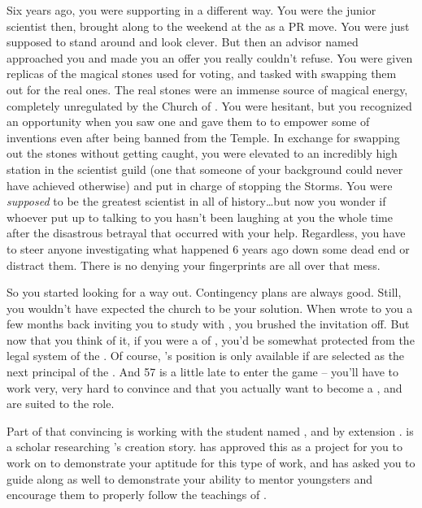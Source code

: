 \documentclass[char]{GL2020}
\begin{document}
Six years ago, you were supporting \cChupInventor{} in a different way. You were the junior scientist then, brought along to the weekend at the \pSchool{} as a PR move. You were just supposed to stand around and look clever. But then an advisor named \cEvil{} approached you and made you an offer you really couldn’t refuse. You were given replicas of the magical stones used for voting, and tasked with swapping them out for the real ones. The real stones were an immense source of magical energy, completely unregulated by the Church of \cTechGod{}. You were hesitant, but you recognized an opportunity when you saw one and gave them to \cChupInventor{} to empower some of \cChupInventor{\their} inventions even after being banned from the Temple. In exchange for swapping out the stones without getting caught, you were elevated to an incredibly high station in the scientist guild (one that someone of your background could never have achieved otherwise) and put in charge of stopping the Storms. You were \emph{supposed} to be the greatest scientist in all of history\ldots but now you wonder if whoever put \cEvil{} up to talking to you hasn’t been laughing at you the whole time after the disastrous betrayal that occurred with your help. Regardless, you have to steer anyone investigating what happened 6 years ago down some dead end or distract them. There is no denying your fingerprints are all over that mess.

So you started looking for a way out. Contingency plans are always good. Still, you wouldn’t have expected the church to be your solution. When \cBeetle{} wrote to you a few months back inviting you to study with \cBeetle{\them}, you brushed the invitation off. But now that you think of it, if you were a \cHeadScientist{\cleric} of \cTechGod{}, you’d be somewhat protected from the legal system of the \pTech{}. Of course, \cBeetle{}’s position is only available if \cBeetle{\they} are selected as the next principal of the \pSc{}. And 57 is a little late to enter the game -- you’ll have to work very, very hard to convince \cAntiChup{} and \cReligion{} that you actually want to become a \HeadScientist{\cleric}, and are suited to the role.

Part of that convincing is working with the student named \cScholarship{}, and by extension \cEbbPriest{}. \cEbbPriest{} is a scholar researching \pEarth{}’s creation story. \cReligion{} has approved this as a project for you to work on to demonstrate your aptitude for this type of work, and has asked you to guide \cScholarship{} along as well to demonstrate your ability to mentor youngsters and encourage them to properly follow the teachings of \cTechGod{}.
\end{document}
